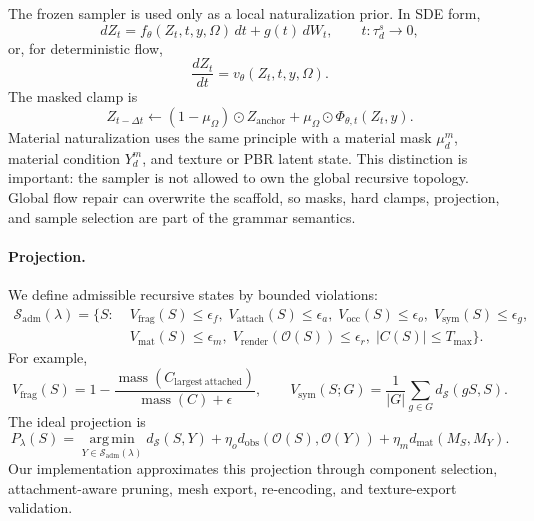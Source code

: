 The frozen sampler is used only as a local naturalization prior. In SDE form,
\begin{equation}
dZ_t=f_\theta(Z_t,t,y,\Omega)\,dt+g(t)\,dW_t,\qquad t:\tau_d^s\rightarrow0,
\end{equation}
or, for deterministic flow,
\begin{equation}
\frac{dZ_t}{dt}=v_\theta(Z_t,t,y,\Omega).
\end{equation}
The masked clamp is
\begin{equation}
Z_{t-\Delta t}\leftarrow
(1-\mu_\Omega)\odot Z_{\mathrm{anchor}}
+\mu_\Omega\odot\Phi_{\theta,t}(Z_t,y).
\end{equation}
Material naturalization uses the same principle with a material mask \(\mu_d^m\), material condition \(Y_d^m\), and texture or PBR latent state. This distinction is important: the sampler is not allowed to own the global recursive topology. Global flow repair can overwrite the scaffold, so masks, hard clamps, projection, and sample selection are part of the grammar semantics.

\paragraph{Projection.}
We define admissible recursive states by bounded violations:
\begin{equation}
\begin{split}
\mathcal{S}_{\mathrm{adm}}(\lambda)=
\{S:\;&
V_{\mathrm{frag}}(S)\leq\epsilon_f,\;
V_{\mathrm{attach}}(S)\leq\epsilon_a,\;
V_{\mathrm{occ}}(S)\leq\epsilon_o,\;
V_{\mathrm{sym}}(S)\leq\epsilon_g,\\
&
V_{\mathrm{mat}}(S)\leq\epsilon_m,\;
V_{\mathrm{render}}(\mathcal{O}(S))\leq\epsilon_r,\;
|C(S)|\leq T_{\max}\}.
\end{split}
\end{equation}
For example,
\begin{equation}
V_{\mathrm{frag}}(S)=
1-\frac{\operatorname{mass}(C_{\mathrm{largest\ attached}})}
{\operatorname{mass}(C)+\epsilon},
\qquad
V_{\mathrm{sym}}(S;G)=
\frac{1}{|G|}\sum_{g\in G}d_{\mathcal{S}}(gS,S).
\end{equation}
The ideal projection is
\begin{equation}
P_\lambda(S)=
\operatorname*{arg\,min}_{Y\in\mathcal{S}_{\mathrm{adm}}(\lambda)}
d_{\mathcal{S}}(S,Y)
+\eta_o d_{\mathrm{obs}}(\mathcal{O}(S),\mathcal{O}(Y))
+\eta_m d_{\mathrm{mat}}(M_S,M_Y).
\end{equation}
Our implementation approximates this projection through component selection, attachment-aware pruning, mesh export, re-encoding, and texture-export validation.

